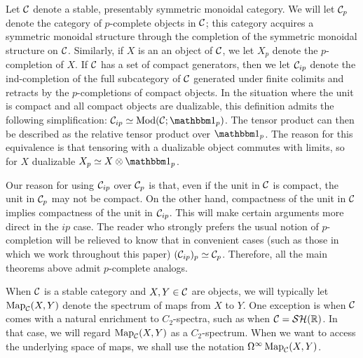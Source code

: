 
Let $\mathcal{C}$ denote a stable, presentably symmetric monoidal category.
We will let $\mathcal{C}_p$ denote the category of $p$-complete objects in $\mathcal{C}$; this category acquires a symmetric monoidal structure through the completion of the symmetric monoidal structure on $\mathcal{C}$.
Similarly, if $X$ is an an object of $\mathcal{C}$, we let $X_p$ denote the $p$-completion of $X$.
If $\mathcal{C}$ has a set of compact generators, then we let $\mathcal{C}_{ip}$ denote the ind-completion of the full subcategory of $\mathcal{C}$ generated under finite colimits and retracts by the $p$-completions of compact objects. In the situation where the unit is compact and all compact objects are dualizable, this definition admits the following simplification: $\CC_{ip} \simeq \Mod ( \CC ; \o_p)$. The tensor product can then be described as the relative tensor product over $\o_p$. The reason for this equivalence is that tensoring with a dualizable object commutes with limits, so for $X$ dualizable $X_p \simeq X \otimes \o_p$.

Our reason for using $\mathcal{C}_{ip}$ over $\mathcal{C}_p$ is that, even if the unit in $\mathcal{C}$ is compact, the unit in $\mathcal{C}_p$ may not be compact. On the other hand, compactness of the unit in $\mathcal{C}$ implies compactness of the unit in $\mathcal{C}_{ip}$. This will make certain arguments more direct in the $ip$ case.
The reader who strongly prefers the usual notion of $p$-completion will be relieved to know that in convenient cases (such as those in which we work throughout this paper) $(\mathcal{C}_{ip})_p \simeq \mathcal{C}_p$. Therefore, all the main theorems above admit $p$-complete analogs. 

When $\mathcal{C}$ is a stable category and $X,Y \in \mathcal{C}$ are objects, we will typically let $\operatorname{\mathrm{Map}}_{\mathcal{C}} (X,Y)$ denote the spectrum of maps from $X$ to $Y$.
One exception is when $\mathcal{C}$ comes with a natural enrichment to $C_2$-spectra, such as when $\mathcal{C} = \mathcal{SH}(\mathbb{R})$. In that case, we will regard $\operatorname{\mathrm{Map}}_{\mathcal{C}} (X,Y)$ as a $C_2$-spectrum.
When we want to access the underlying space of maps, we shall use the notation $\Omega^{\infty} \operatorname{\mathrm{Map}}_{\mathcal{C}} (X,Y)$.


